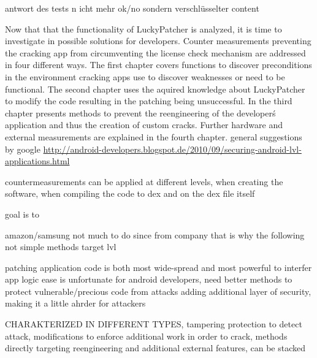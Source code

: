 antwort des tests n icht mehr ok/no sondern verschlüsselter content



Now that that the functionality of LuckyPatcher is analyzed, it is time to investigate in possible solutions for developers. Counter measurements preventing the cracking app from circumventing the license check mechanism are addressed in four different ways.\newline
The first chapter covers functions to discover preconditions in the environment cracking apps use to discover weaknesses or need to be functional. The second chapter uses the aquired knowledge about LuckyPatcher to modify the code resulting in the patching being unsuccessful. In the third chapter presents methods to prevent the reengineering of the developer\'s application and thus the creation of custom cracks. Further hardware and external measurements are explained in the fourth chapter.\newline
general suggestions by google  \url{http://android-developers.blogspot.de/2010/09/securing-android-lvl-applications.html}

countermeasurements can be applied at different levels, when creating the software, when compiling the code to dex and on the dex file itself

%
goal is to

amazon/samsung not much to do since from company that is why the following not simple methods target lvl

patching application code is both most wide-spread and most powerful to interfer app logic
ease is unfortunate for android developers, need better methods to protect vulnerable/precious code from attacks
adding additional layer of security, making it a little ahrder for attackers

CHARAKTERIZED IN DIFFERENT TYPES, tampering protection to detect attack, modifications to enforce additional work in order to crack, methods directly targeting reengineering and additional external features, can be stacked
\cite{munteanLicense}
%
